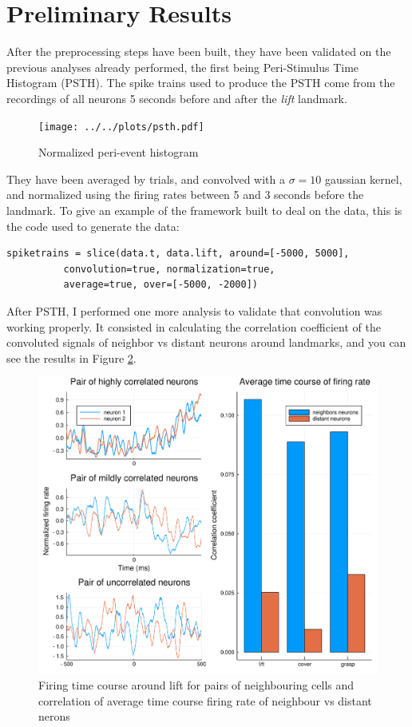 \section{Preliminary Results}

After the preprocessing steps have been built, they have been validated on the previous analyses already performed, the first being Peri-Stimulus Time Histogram (PSTH). The spike trains used to produce the PSTH come from the recordings of all neurons 5 seconds before and after the \emph{lift} landmark. 
\begin{figure}[h!]
	\centering
	\texttt{[image: ../../plots/psth.pdf]}
	\caption{Normalized peri-event histogram}
	\label{fig:psth}
\end{figure}
They have been averaged by trials, and convolved with a $\sigma=10$ gaussian kernel, and normalized using the firing rates between 5 and 3 seconds before the landmark. To give an example of the framework built to deal on the data, this is the code used to generate the data:
\bigskip 
\begin{lstlisting}[]
spiketrains = slice(data.t, data.lift, around=[-5000, 5000], 
		  convolution=true, normalization=true, 
		  average=true, over=[-5000, -2000])
\end{lstlisting}
\bigskip
After PSTH, I performed one more analysis to validate that convolution was working properly. It consisted in calculating the correlation coefficient of the convoluted signals of neighbor vs distant neurons around landmarks, and you can see the results in Figure \ref{fig:corr-coeff}.

\begin{figure}[h!]
	\centering
	\includegraphics[scale=0.5]{../../plots/corr-coef.pdf}
	\caption{Firing time course around lift for pairs of neighbouring cells and correlation of average time course firing rate of neighbour vs distant nerons}
	\label{fig:corr-coeff}
\end{figure}

